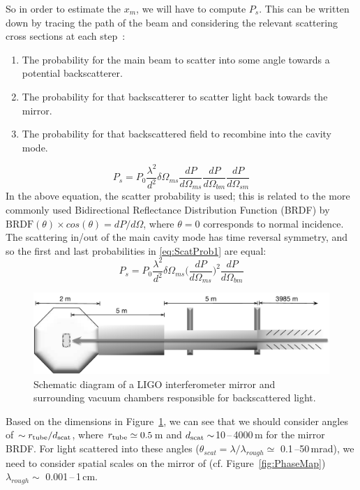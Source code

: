 So in order to estimate the $x_m$, we will have to compute $P_s$.
This can be written down by tracing the path of the beam and considering
the relevant scattering cross sections at each step~\cite{Kip:Baffles1989}:
\begin{enumerate}
\item The probability for the main beam to scatter into some angle towards a potential backscatterer.
\item The probability for that backscatterer to scatter light back towards the mirror.
\item The probability for that backscattered field to recombine into the cavity mode.
\end{enumerate}
\begin{equation}
P_s = P_0 \frac{\lambda^2}{d^2} \delta \Omega_{ms} \frac{dP}{d\Omega_{ms}} \frac{dP}{d\Omega_{bm}} \frac{dP}{d\Omega_{sm}}
\label{eq:ScatProb1}
\end{equation}
In the above equation, the scatter probability is used; this is related to the
more commonly used Bidirectional Reflectance Distribution Function (BRDF) by
$ \mathrm{BRDF}(\theta) \times cos(\theta) = dP/d\Omega$, where $\theta = 0$
corresponds to normal incidence.
The scattering in/out of the main cavity mode has time reversal symmetry,
and so the first and last probabilities in \eqref{eq:ScatProb1} are equal:
\begin{equation}
P_s = P_0 \frac{\lambda^2}{d^2} \delta \Omega_{ms}
\bigg(\frac{dP}{d\Omega_{ms}}\bigg)^2 \frac{dP}{d\Omega_{bm}}
\label{eq:ScatProb2}
\end{equation}

\begin{figure}[h]
  \centering
    \includegraphics[width=\columnwidth]{Figures/ETM_scatter-BW.pdf}
    \caption{Schematic diagram of a LIGO interferometer mirror and
    surrounding vacuum chambers responsible for backscattered light.}
    \label{fig:ETMscat}
\end{figure}

Based on the dimensions in Figure~\ref{fig:ETMscat}, we can see that
we should consider angles of $\sim r_{\rm tube}/d_{\rm scat}$, where
$r_{\rm tube} \simeq 0.5$\,m and $d_{\rm scat} \sim$10\,--\,4000\,m
for the mirror BRDF. 
For light scattered into these angles ($\theta_{scat} = \lambda /
\lambda_{rough} \simeq$ 0.1\,--50\,mrad), 
we need to consider spatial scales on the mirror of
 (cf. Figure~\ref{fig:PhaseMap}) $\lambda_{rough} \sim $ 0.001\,--\,1\,cm.

